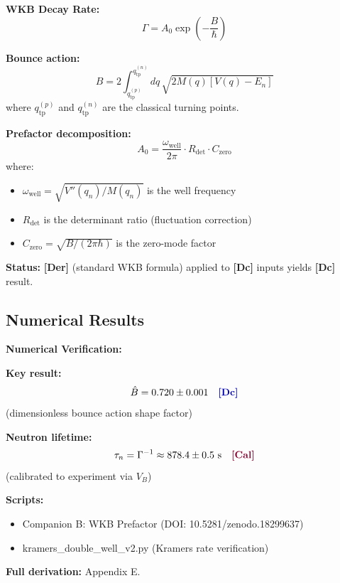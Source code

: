 \documentclass[11pt,a4paper]{article}
\newcommand{\tagDc}{\textcolor{blue!70!black}{\textbf{[Dc]}}}
\newcommand{\tagDer}{\textcolor{green!50!black}{\textbf{[Der]}}}
\newcommand{\tagCal}{\textcolor{purple!70!black}{\textbf{[Cal]}}}
\begin{document}
\begin{derivbox}
\textbf{WKB Decay Rate:}
\begin{equation}
    \Gamma = A_0 \exp\left( -\frac{B}{\hbar} \right)
    \label{eq:wkb_rate}
\end{equation}

\textbf{Bounce action:}
\begin{equation}
    B = 2 \int_{q_{\text{tp}}^{(p)}}^{q_{\text{tp}}^{(n)}} dq \, \sqrt{2 M(q) \left[ V(q) - E_n \right]}
    \label{eq:bounce_action}
\end{equation}
where $q_{\text{tp}}^{(p)}$ and $q_{\text{tp}}^{(n)}$ are the classical turning points.

\textbf{Prefactor decomposition:}
\begin{equation}
    A_0 = \frac{\omega_{\text{well}}}{2\pi} \cdot R_{\text{det}} \cdot C_{\text{zero}}
    \label{eq:prefactor}
\end{equation}
where:
\begin{itemize}[nosep]
    \item $\omega_{\text{well}} = \sqrt{V''(q_n) / M(q_n)}$ is the well frequency
    \item $R_{\text{det}}$ is the determinant ratio (fluctuation correction)
    \item $C_{\text{zero}} = \sqrt{B/(2\pi\hbar)}$ is the zero-mode factor
\end{itemize}
\end{derivbox}

\textbf{Status:} \tagDer{} (standard WKB formula) applied to \tagDc{} inputs yields \tagDc{} result.

\subsection{Numerical Results}

\begin{scriptbox}
\textbf{Numerical Verification:}

\textbf{Key result:}
\begin{equation}
    \hat{B} = 0.720 \pm 0.001 \quad \tagDc{}
\end{equation}
(dimensionless bounce action shape factor)

\textbf{Neutron lifetime:}
\begin{equation}
    \tau_n = \Gamma^{-1} \approx 878.4 \pm 0.5 \text{ s} \quad \tagCal{}
\end{equation}
(calibrated to experiment via $V_B$)

\textbf{Scripts:}
\begin{itemize}[nosep]
    \item Companion B: WKB Prefactor (DOI: 10.5281/zenodo.18299637)
    \item kramers\_double\_well\_v2.py (Kramers rate verification)
\end{itemize}

\textbf{Full derivation:} Appendix E.
\end{scriptbox}
\end{document}
